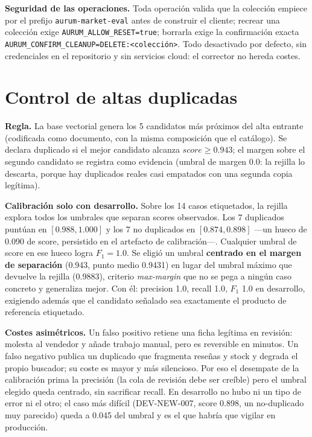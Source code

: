 \documentclass[10pt,twocolumn]{article}
\newcommand{\code}[1]{\texttt{\small #1}}
\begin{document}
\textbf{Seguridad de las operaciones.} Toda operación valida que la
colección empiece por el prefijo \code{aurum-market-eval} antes de construir
el cliente; recrear una colección exige \code{AURUM\_ALLOW\_RESET=true};
borrarla exige la confirmación exacta
\code{AURUM\_CONFIRM\_CLEANUP=DELETE:<colección>}. Todo desactivado por
defecto, sin credenciales en el repositorio y sin servicios cloud: el
corrector no hereda costes.

\section{Control de altas duplicadas}
\label{sec:duplicados}

\textbf{Regla.} La base vectorial genera los 5 candidatos más próximos del
alta entrante (codificada como documento, con la misma composición que el
catálogo). Se declara duplicado si el mejor candidato alcanza
$\mathit{score} \geq 0.943$; el margen sobre el segundo candidato se registra
como evidencia (umbral de margen $0.0$: la rejilla lo descarta, porque hay
duplicados reales casi empatados con una segunda copia legítima).

\textbf{Calibración solo con desarrollo.} Sobre los 14 casos etiquetados, la
rejilla explora todos los umbrales que separan scores observados. Los 7
duplicados puntúan en $[0.988, 1.000]$ y los 7 no duplicados en
$[0.874, 0.898]$ ---un hueco de 0.090 de score, persistido en el artefacto
de calibración---. Cualquier umbral de score en ese hueco logra $F_1{=}1.0$. Se
eligió un umbral \textbf{centrado en el margen de separación} (0.943, punto
medio 0.9431) en lugar del umbral máximo que devuelve la rejilla (0.9883),
criterio \emph{max-margin} que no se pega a ningún caso concreto y
generaliza mejor. Con él: precision 1.0, recall 1.0, $F_1$ 1.0 en
desarrollo, exigiendo además que el candidato señalado sea exactamente el
producto de referencia etiquetado.

\textbf{Costes asimétricos.} Un falso positivo retiene una ficha legítima en
revisión: molesta al vendedor y añade trabajo manual, pero es reversible en
minutos. Un falso negativo publica un duplicado que fragmenta reseñas y
stock y degrada el propio buscador; su coste es mayor y más silencioso. Por
eso el desempate de la calibración prima la precisión (la cola de revisión
debe ser creíble) pero el umbral elegido queda centrado, sin sacrificar
recall. En desarrollo no hubo ni un tipo de error ni el otro; el caso más
difícil (DEV-NEW-007, score 0.898, un no-duplicado muy parecido) queda a
0.045 del umbral y es el que habría que vigilar en producción.
\end{document}
